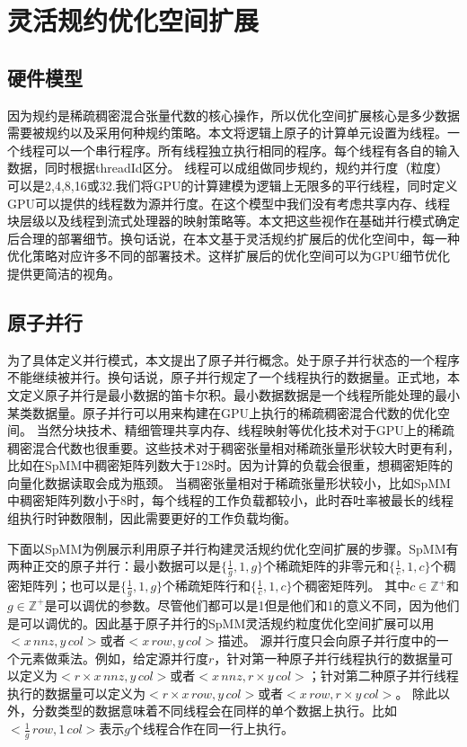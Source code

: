 \section{灵活规约优化空间扩展}
\subsection{硬件模型}\label{sec:hwmodel}
因为规约是稀疏稠密混合张量代数的核心操作，所以优化空间扩展核心是多少数据需要被规约以及采用何种规约策略。本文将逻辑上原子的计算单元设置为线程。一个线程可以一个串行程序。所有线程独立执行相同的程序。每个线程有各自的输入数据，同时根据threadId区分。
线程可以成组做同步规约，规约并行度（粒度）可以是2,4,8,16或32.我们将GPU的计算建模为逻辑上无限多的平行线程，同时定义GPU可以提供的线程数为源并行度。在这个模型中我们没有考虑共享内存、线程块层级以及线程到流式处理器的映射策略等。本文把这些视作在基础并行模式确定后合理的部署细节。换句话说，在本文基于灵活规约扩展后的优化空间中，每一种优化策略对应许多不同的部署技术。这样扩展后的优化空间可以为GPU细节优化提供更简洁的视角。
\subsection{原子并行}\label{sec:atomicparallel}
为了具体定义并行模式，本文提出了原子并行概念。处于原子并行状态的一个程序不能继续被并行。换句话说，原子并行规定了一个线程执行的数据量。正式地，本文定义原子并行是最小数据的笛卡尔积。最小数据数据是一个线程所能处理的最小某类数据量。原子并行可以用来构建在GPU上执行的稀疏稠密混合代数的优化空间。
当然分块技术、精细管理共享内存、线程映射等优化技术对于GPU上的稀疏稠密混合代数也很重要\cite{hidayetouglu2020scale,mehrabi2021learning,xin2021fast,gale2020sparse}。这些技术对于稠密张量相对稀疏张量形状较大时更有利，比如在SpMM中稠密矩阵列数大于128时。因为计算的负载会很重，想稠密矩阵的向量化数据读取会成为瓶颈。
当稠密张量相对于稀疏张量形状较小，比如SpMM中稠密矩阵列数小于8时，每个线程的工作负载都较小，此时吞吐率被最长的线程组执行时钟数限制，因此需要更好的工作负载均衡。

下面以SpMM为例展示利用原子并行构建灵活规约优化空间扩展的步骤。SpMM有两种正交的原子并行：最小数据可以是$\{\frac{1}{g},1,g\}$个稀疏矩阵的非零元和$\{\frac{1}{c},1,c\}$个稠密矩阵列；也可以是$\{\frac{1}{g},1,g\}$个稀疏矩阵行和$\{\frac{1}{c},1,c\}$个稠密矩阵列。
其中$c\in \mathbb{Z^+}$和$g\in \mathbb{Z^+}$是可以调优的参数。尽管他们都可以是1但是他们和1的意义不同，因为他们是可以调优的。因此基于原子并行的SpMM灵活规约粒度优化空间扩展可以用$<x\,nnz , y\,col>$或者$<x\,row, y\,col>$描述。
源并行度只会向原子并行度中的一个元素做乘法。例如，给定源并行度$r$，针对第一种原子并行线程执行的数据量可以定义为$<r \times x\,nnz , y\,col>$或者$<x\,nnz, r \times y\,col>$；针对第二种原子并行线程执行的数据量可以定义为$<r \times x\,row , y\,col>$或者$<x\,row, r \times y\,col>$。
除此以外，分数类型的数据意味着不同线程会在同样的单个数据上执行。比如$<\frac{1}{g}\, row, 1\, col>$表示$g$个线程合作在同一行上执行。

